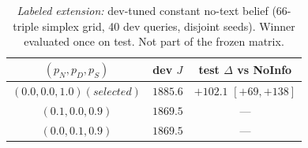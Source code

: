 \begin{table}[t]
\centering
\caption{\emph{Labeled extension:} dev-tuned constant no-text belief (66-triple simplex grid, 40 dev queries, disjoint seeds). Winner evaluated once on test. Not part of the frozen matrix.}
\label{tab:tuned}
\begin{tabular}{ccc}
\toprule
$(p_N,p_D,p_S)$ & dev $J$ & test $\Delta$ vs NoInfo \\
\midrule
$(0.0,0.0,1.0) (selected)$ & $1885.6$ & $+102.1$ $[+69,+138]$ \\
$(0.1,0.0,0.9)$ & $1869.5$ & --- \\
$(0.0,0.1,0.9)$ & $1869.5$ & --- \\
\bottomrule
\end{tabular}
\end{table}

